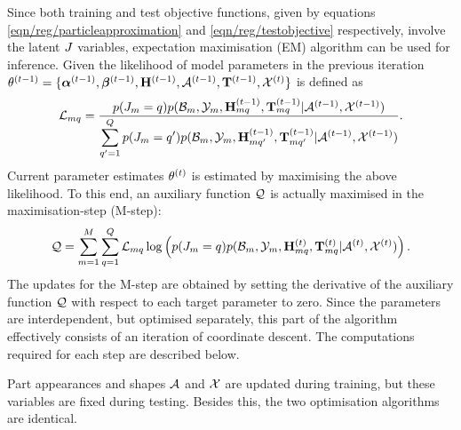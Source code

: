 Since both training and test objective functions, given by equations \ref{eqn/reg/particleapproximation} and \ref{eqn/reg/testobjective} respectively, involve the latent ${J}$ variables, expectation maximisation (EM) algorithm can be used for inference. 
Given the likelihood of model parameters in the previous iteration $\theta^{(t-1)} = \{\bm{\alpha}^{(t-1)},\bm{\beta}^{(t-1)},\mathbf{H}^{(t-1)},\mathcal{A}^{(t-1)},\mathbf{T}^{(t-1)},\mathcal{X}^{(t)}\}$ is defined as
\begin{equation}
	\mathcal{L}_{mq} = \frac{p({J}_{m} = q)p(\mathcal{B}_m,\mathcal{Y}_m,\mathbf{H}^{(t-1)}_{mq},\mathbf{T}^{(t-1)}_{mq}|\mathcal{A}^{(t-1)},\mathcal{X}^{(t-1)})}{\displaystyle\sum_{q' = 1}^{Q} p({J}_{m}  =  q')p(\mathcal{B}_m,\mathcal{Y}_m,\mathbf{H}^{(t-1)}_{mq'},\mathbf{T}^{(t-1)}_{mq'}|\mathcal{A}^{(t-1)},\mathcal{X}^{(t-1)})}.
\end{equation}
Current parameter estimates $\theta^{(t)}$ is estimated by maximising the above likelihood. To this end, an auxiliary function $\mathcal{Q}$ is actually maximised in the maximisation-step (M-step):  
\begin{equation}
	\mathcal{Q} = \displaystyle\sum_{m=1}^M \displaystyle\sum_{q = 1}^{Q} \mathcal{L}_{mq} \log \left( p({J}_{m} = q)p(\mathcal{B}_m,\mathcal{Y}_m,\mathbf{H}^{(t)}_{mq},\mathbf{T}^{(t)}_{mq}|\mathcal{A}^{(t)},\mathcal{X}^{(t)}) \right).
	\label{eqn/reg/auxiliary}
\end{equation}
The updates for the M-step are obtained by setting the derivative of the auxiliary function $\mathcal{Q}$ with respect to each target parameter to zero. Since the parameters are interdependent, but optimised separately, this part of the algorithm effectively consists of an iteration of coordinate descent. The computations required for each step are described below.

Part appearances and shapes $\mathcal{A}$ and $\mathcal{X}$ are updated during training, but these variables are fixed during testing. Besides this, the two optimisation algorithms are identical. 

